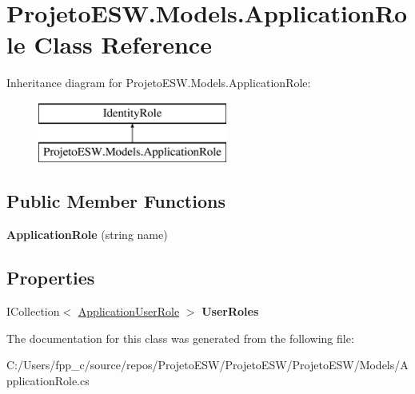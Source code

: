 \hypertarget{class_projeto_e_s_w_1_1_models_1_1_application_role}{}\section{Projeto\+E\+S\+W.\+Models.\+Application\+Role Class Reference}
\label{class_projeto_e_s_w_1_1_models_1_1_application_role}
Inheritance diagram for Projeto\+E\+S\+W.\+Models.\+Application\+Role\+:\begin{figure}[H]
\begin{center}
\leavevmode
\includegraphics[height=2.000000cm]{class_projeto_e_s_w_1_1_models_1_1_application_role}
\end{center}
\end{figure}
\subsection*{Public Member Functions}
\begin{DoxyCompactItemize}
\item 
\mbox{\label{class_projeto_e_s_w_1_1_models_1_1_application_role_ad3b5869d1ecf245928553e64adce7f4a}} 
{\bfseries Application\+Role} (string name)
\end{DoxyCompactItemize}
\subsection*{Properties}
\begin{DoxyCompactItemize}
\item 
\mbox{\label{class_projeto_e_s_w_1_1_models_1_1_application_role_adb700c39389672d431779707d769e542}} 
I\+Collection$<$ \mbox{\hyperlink{class_projeto_e_s_w_1_1_models_1_1_application_user_role}{Application\+User\+Role}} $>$ {\bfseries User\+Roles}
\end{DoxyCompactItemize}


The documentation for this class was generated from the following file\+:\begin{DoxyCompactItemize}
\item 
C\+:/\+Users/fpp\+\_\+c/source/repos/\+Projeto\+E\+S\+W/\+Projeto\+E\+S\+W/\+Projeto\+E\+S\+W/\+Models/Application\+Role.\+cs\end{DoxyCompactItemize}
